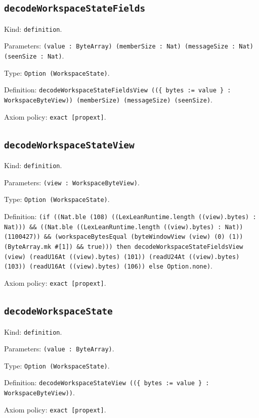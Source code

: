 \documentclass[11pt]{article}
\begin{document}
\subsection*{\texttt{decodeWorkspaceStateFields}}
\noindent Kind: \texttt{definition}.\par
\noindent Parameters: \texttt{(value : ByteArray) (memberSize : Nat) (messageSize : Nat) (seenSize : Nat)}.\par
\noindent Type: \texttt{Option (WorkspaceState)}.\par
\noindent Definition: \texttt{decodeWorkspaceStateFieldsView ((\{ bytes := value \} : WorkspaceByteView)) (memberSize) (messageSize) (seenSize)}.\par
\noindent Axiom policy: \texttt{exact [propext]}.\par
\subsection*{\texttt{decodeWorkspaceStateView}}
\noindent Kind: \texttt{definition}.\par
\noindent Parameters: \texttt{(view : WorkspaceByteView)}.\par
\noindent Type: \texttt{Option (WorkspaceState)}.\par
\noindent Definition: \texttt{(if ((Nat.ble (108) ((LexLeanRuntime.length ((view).bytes) : Nat))) \&\& ((Nat.ble ((LexLeanRuntime.length ((view).bytes) : Nat)) (1100427)) \&\& (workspaceBytesEqual (byteWindowView (view) (0) (1)) (ByteArray.mk \#[1]) \&\& true))) then decodeWorkspaceStateFieldsView (view) (readU16At ((view).bytes) (101)) (readU24At ((view).bytes) (103)) (readU16At ((view).bytes) (106)) else Option.none)}.\par
\noindent Axiom policy: \texttt{exact [propext]}.\par
\subsection*{\texttt{decodeWorkspaceState}}
\noindent Kind: \texttt{definition}.\par
\noindent Parameters: \texttt{(value : ByteArray)}.\par
\noindent Type: \texttt{Option (WorkspaceState)}.\par
\noindent Definition: \texttt{decodeWorkspaceStateView ((\{ bytes := value \} : WorkspaceByteView))}.\par
\noindent Axiom policy: \texttt{exact [propext]}.\par
\end{document}

